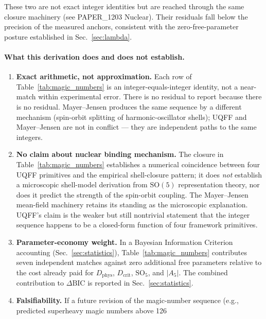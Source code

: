 These two are not exact integer identities but are reached through the
same closure machinery (see PAPER\_1203 Nuclear). Their residuals fall
below the precision of the measured anchors, consistent with the
zero-free-parameter posture established in Sec.~\ref{sec:lambda}.

\paragraph{What this derivation does and does not establish.}

\begin{enumerate}
  \item \textbf{Exact arithmetic, not approximation.} Each row of
        Table~\ref{tab:magic_numbers} is an integer-equals-integer
        identity, not a near-match within experimental error. There
        is no residual to report because there is no residual.
        Mayer--Jensen produces the same sequence by a different
        mechanism (spin-orbit splitting of harmonic-oscillator shells);
        UQFF and Mayer--Jensen are not in conflict --- they are
        independent paths to the same integers.
  \item \textbf{No claim about nuclear binding mechanism.} The closure
        in Table~\ref{tab:magic_numbers} establishes a numerical
        coincidence between four UQFF primitives and the empirical
        shell-closure pattern; it does \emph{not} establish a
        microscopic shell-model derivation from $\mathrm{SO}(5)$
        representation theory, nor does it predict the strength of the
        spin-orbit coupling. The Mayer--Jensen mean-field machinery
        retains its standing as the microscopic explanation. UQFF's
        claim is the weaker but still nontrivial statement that the
        integer sequence happens to be a closed-form function of four
        framework primitives.
  \item \textbf{Parameter-economy weight.} In a Bayesian
        Information Criterion accounting
        (Sec.~\ref{sec:statistics}), Table~\ref{tab:magic_numbers}
        contributes seven independent matches against zero additional
        free parameters relative to the cost already paid for
        $D_{\text{phys}}$, $D_{\text{crit}}$, $\mathrm{SO}_5$, and
        $|A_5|$. The combined contribution to $\Delta\mathrm{BIC}$ is
        reported in Sec.~\ref{sec:statistics}.
  \item \textbf{Falsifiability.} If a future revision of the magic-number
        sequence (e.g., predicted superheavy magic numbers above 126

\end{enumerate}
